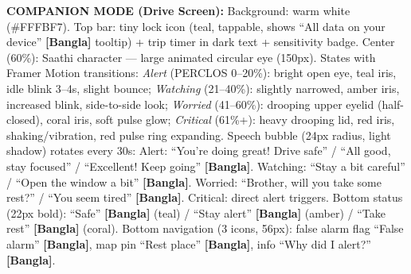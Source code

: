\documentclass[sigconf]{acmart}
\begin{document}
\begin{promptbox}
\textbf{COMPANION MODE (Drive Screen):} Background: warm white (\#FFFBF7). Top bar: tiny lock icon (teal, tappable, shows ``All data on your device'' \textbf{[Bangla]} tooltip) + trip timer in dark text + sensitivity badge. Center (60\%): Saathi character --- large animated circular eye (150px). States with Framer Motion transitions: \textit{Alert} (PERCLOS 0--20\%): bright open eye, teal iris, idle blink 3--4s, slight bounce; \textit{Watching} (21--40\%): slightly narrowed, amber iris, increased blink, side-to-side look; \textit{Worried} (41--60\%): drooping upper eyelid (half-closed), coral iris, soft pulse glow; \textit{Critical} (61\%+): heavy drooping lid, red iris, shaking/vibration, red pulse ring expanding. Speech bubble (24px radius, light shadow) rotates every 30s: Alert: ``You're doing great! Drive safe'' / ``All good, stay focused'' / ``Excellent! Keep going'' \textbf{[Bangla]}. Watching: ``Stay a bit careful'' / ``Open the window a bit'' \textbf{[Bangla]}. Worried: ``Brother, will you take some rest?'' / ``You seem tired'' \textbf{[Bangla]}. Critical: direct alert triggers. Bottom status (22px bold): ``Safe'' \textbf{[Bangla]} (teal) / ``Stay alert'' \textbf{[Bangla]} (amber) / ``Take rest'' \textbf{[Bangla]} (coral). Bottom navigation (3 icons, 56px): false alarm flag ``False alarm'' \textbf{[Bangla]}, map pin ``Rest place'' \textbf{[Bangla]}, info ``Why did I alert?'' \textbf{[Bangla]}.
\end{promptbox}
 
\end{document}
